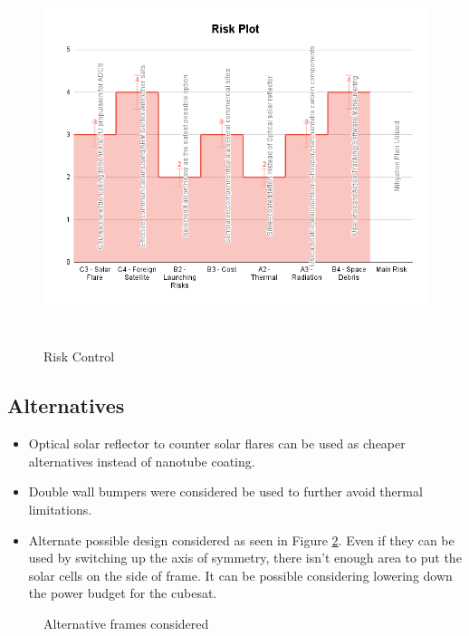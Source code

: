 \begin{figure}[hbt!]
    \centering
    \includegraphics[width=\textwidth,frame, height=11cm]{Images/rplot.png}
    \caption{Risk Control}
    \label{fig:rplot}
\end{figure}

\subsection{Alternatives}
\begin{itemize}[noitemsep]
  \item 
Optical solar reflector to counter solar flares can be used  as cheaper alternatives instead of nanotube coating. 
  \item 
  Double wall bumpers were considered be used to further avoid thermal limitations. 
  \item 
  Alternate possible design considered as seen in Figure \ref{fig:alter}. Even if they can be used by switching up the axis of symmetry, there isn't enough area to put the solar cells on the side of frame. It can be possible considering lowering down the power budget for the cubesat.
\end{itemize}
\begin{figure}
    \centering
    \label{fig:a1}
    \qquad
    \label{fig:a2}
    \caption{Alternative frames considered}
    \label{fig:alter}
\end{figure}
